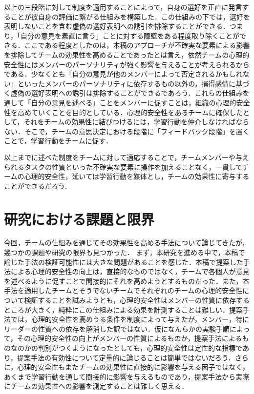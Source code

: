 \documentclass[a4paper, 11pt]{jsarticle}
\begin{document}
以上の三段階に対して制度を適用することによって，自身の選好を正直に発言することが彼自身の評価に繋がる仕組みを構築した．この仕組みの下では，選好を表明しないことを含む虚偽の選好表明への誘引を排除することができる．つまり，「自分の意見を素直に言う」ことに対する障壁をある程度取り除くことができる．ここである程度としたのは，本稿のアプローチが不確実な要素による影響を排除してチームの効果性を高めることであったとは言え，依然チームの心理的安全性にはメンバーのパーソナリティが強く影響を与えることが考えられるからである．少なくとも「自分の意見が他のメンバーによって否定されるかもしれない」といったメンバーのパーソナリティに依存するもの以外の，損得感情に基づく虚偽の選好表明への誘引は排除することができるであろう．これらの仕組みを通して「自分の意見を述べる」ことをメンバーに促すことは，組織の心理的安全性を高めていくことを目的としている．心理的安全性をあるチームに確保したとして，それをチームの効果性に結びつけるには，学習行動を仲介しなければならない．そこで，チームの意思決定における段階に「フィードバック段階」を置くことで，学習行動をチームに促す．

以上までに述べた制度をチームに対して適応することで，チームメンバーや与えられるタスクの性質といった不確実な要素に操作を加えることなく，一貫してチームの心理的安全性，延いては学習行動を媒体とし，チームの効果性に寄与することができるだろう．

\section{研究における課題と限界}
今回，チームの仕組みを通じてその効果性を高める手法について論じてきたが，幾つかの課題や研究の限界も見つかった．
まず，本研究を進める中で，本稿で論じた手法の検証可能性には大きな問題があることを感じた．本稿で提案した手法による心理的安全性の向上は，直接的なものではなく，チームで各個人が意見を述べるように促すことで間接的にそれを高めようとするものだった．また，本手法を適用したチームとそうでないチームでそれぞれのチームの心理的安全性について検証することを試みようとも，心理的安全性はメンバーの性質に依存するところが大きく，純粋にこの仕組みによる効果を計測することは難しい．提案手法では，心理的安全性を高めうる条件を制度によって与えたが，メンバー，特にリーダーの性質への依存を解消した訳ではない．仮になんらかの実験手順によって，その心理的安全性の向上がメンバーの性質によるものか，提案手法によるものなのかの判別がつくようになったとしても，心理的安全性は定性的な指標であり，提案手法の有効性について定量的に論じることは簡単ではないだろう．さらに，心理的安全性もまたチームの効果性に直接的に影響を与える因子ではなく，あくまで学習行動を通して間接的に影響を与えるものであり，提案手法から実際にチームの効果性への影響を測定することは難しく思える．
\end{document}
